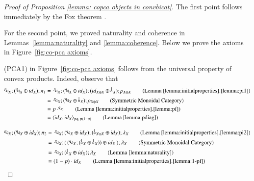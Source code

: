 \begin{proof}[Proof of Proposition \ref{lemma: copca objects in convbicat}]
The first point follows immediately by the Fox theorem \cite{fox1976coalgebras}.

For the second point, we proved naturality and coherence in Lemmas~\ref{lemma:naturality} and \ref{lemma:coherence}. Below we prove the axioms in Figure~\ref{fig:co-pca axioms}.

    (PCA1) in Figure~\ref{fig:co-pca axioms} follows from the universal property of convex products. Indeed, observe that 
    \begin{align*}
        \diagp{X} ; (\diagq{X} \oplus \id{X}) ; \pi_1 &=\, \diagp{X} ; (\diagq{X} \oplus \id{X}) ;( \id{X \oplus X} \oplus \bang{X}) ; \runit{X\oplus X} \tag{Lemma \ref{lemma:initialproperties}.\ref{lemma:pi1}}\\
        &=\, \diagp{X} ; (\diagq{X} \oplus \bang{X}) ; \runit{X\oplus X} \tag{Symmetric Monoidal Category}\\
        &= p \cdot \diagq{} \tag{Lemma \ref{lemma:initialproperties}.\ref{lemma:pf}}\\
        &= \langle \id{X}, \id{X} \rangle_{pq,\,p(1-q)}\tag{Lemma \ref{lemma:pdiag}}
    \end{align*}
    
        \begin{align*}
        \diagp{X} ; (\diagq{X} \oplus \id{X}) ; \pi_2 &=\, \diagp{X} ; (\diagq{X} \oplus \id{X}) ;( \bang{X \oplus X} \oplus \id{X}) ; \lunit{X} \tag{Lemma \ref{lemma:initialproperties}.\ref{lemma:pi2}}\\
        & =\, \diagp{X} ; ( \, (\diagq{X} ; (\bang{X} \oplus \bang{X}) ) \oplus \id{X} \,)  ; \lunit{X} \tag{Symmetric Monoidal Category}\\
        &=\, \diagp{X} ;  (\bang{X}  \oplus \id{X} )  ; \lunit{X} \tag{Lemma \ref{lemma:naturality}} \\
        &=  (1-p)\cdot \id{X} \tag{Lemma \ref{lemma:initialproperties}.\ref{lemma:1-pf}}
    \end{align*}
    

\end{proof}
